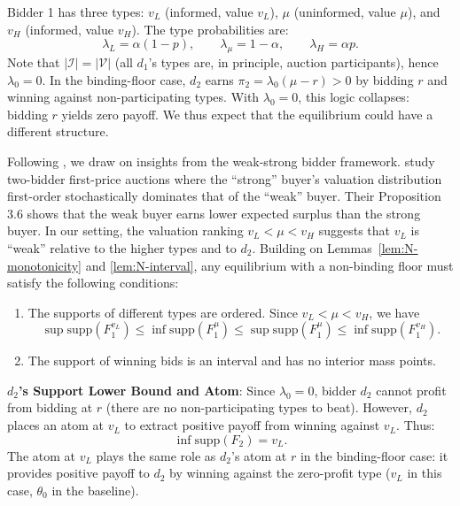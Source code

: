 \documentclass[11pt]{article}
\theoremstyle{plain}
\theoremstyle{definition}
\theoremstyle{plain}
\theoremstyle{plain}
\theoremstyle{plain}
\theoremstyle{plain}
\numberwithin{equation}{section}
\begin{document}
\vspace{0.2cm}

\noindent Bidder 1 has three types: $v_L$ (informed, value $v_L$), $\mu$ (uninformed, value $\mu$), and $v_H$ (informed, value $v_H$). The type probabilities are:
\[
\lambda_L = \alpha(1-p), \qquad \lambda_{\mu} = 1 - \alpha, \qquad \lambda_H = \alpha p.
\]
Note that $|\mathcal{I}| = |\mathcal{V}|$ (all $d_1$'s types are, in principle, auction participants), hence $\lambda_0 = 0$. In the binding-floor case, $d_2$ earns $\pi_2 = \lambda_0(\mu - r) > 0$ by bidding $r$ and winning against non-participating types. With $\lambda_0 = 0$, this logic collapses: bidding $r$ yields zero payoff. We thus expect that the equilibrium could have a different structure.

\vspace{0.2cm}

\noindent Following \textcite{maskinAsymmetricAuctions2000}, we draw on insights from the weak-strong bidder framework. \textcite{maskinAsymmetricAuctions2000} study two-bidder first-price auctions where the ``strong'' buyer's valuation distribution first-order stochastically dominates that of the ``weak'' buyer. Their Proposition 3.6 shows that the weak buyer earns lower expected surplus than the strong buyer. In our setting, the valuation ranking $v_L < \mu < v_H$ suggests that $v_L$ is ``weak'' relative to the higher types and to $d_2$. Building on Lemmas~\ref{lem:N-monotonicity} and \ref{lem:N-interval}, any equilibrium with a non-binding floor must satisfy the following conditions:

\begin{enumerate}
\item The supports of different types are ordered. Since $v_L < \mu < v_H$, we have
\[
\sup \text{supp}(F_1^{v_L}) \leq \inf \text{supp}(F_1^{\mu}) \leq \sup \text{supp}(F_1^{\mu}) \leq \inf \text{supp}(F_1^{v_H}).
\]

\item The support of winning bids is an interval and has no interior mass points.
\end{enumerate}

\iffalse
\item \textbf{$d_2$'s Support Lower Bound and Atom}: Since $\lambda_0 = 0$, bidder $d_2$ cannot profit from bidding at $r$ (there are no non-participating types to beat). However, $d_2$ places an atom at $v_L$ to extract positive payoff from winning against $v_L$. Thus:
\[
\inf \text{supp}(F_2) = v_L.
\]
The atom at $v_L$ plays the same role as $d_2$'s atom at $r$ in the binding-floor case: it provides positive payoff to $d_2$ by winning against the zero-profit type ($v_L$ in this case, $\theta_0$ in the baseline).
\end{document}
